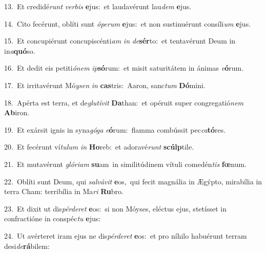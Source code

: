 {\numbfont\textcolor{\numbcolor}{13.}}~Et credidé\textit{runt} \textit{ver}\-\textit{bis} \textbf{e}\-jus:~\star et laudavérunt lau\textit{dem} \textbf{e}\-jus.\par
{\numbfont\textcolor{\numbcolor}{14.}}~Cito fecérunt, oblíti sunt \textit{ó}\-\textit{pe}\textit{rum} \textbf{e}\-jus:~\star et non sustinuérunt consíli\textit{um} \textbf{e}\-jus.\par
{\numbfont\textcolor{\numbcolor}{15.}}~Et concupiérunt concupiscénti\textit{am} \textit{in} \textit{de}\-\textbf{sér}to:~\star et tentavérunt Deum in in\-\textit{a}\-\textbf{quó}so.\par
{\numbfont\textcolor{\numbcolor}{16.}}~Et dedit eis petiti\-\textit{ó}\-\textit{nem} \textit{ip}\-\textbf{só}rum:~\star et misit saturitátem in ánimas \textit{e}\-\textbf{ó}rum.\par
{\numbfont\textcolor{\numbcolor}{17.}}~Et irritavérunt Mó\-\textit{y}\-\textit{sen} \textit{in} \textbf{cas}\-tris:~\star Aaron, sanc\textit{tum} \textbf{Dó}\-mini.\par
{\numbfont\textcolor{\numbcolor}{18.}}~Apérta est terra, et de\-\textit{glu}\-\textit{tí}\textit{vit} \textbf{Da}\-than:~\star et opéruit super congregatió\textit{nem} \textbf{Ab}\-iron.\par
{\numbfont\textcolor{\numbcolor}{19.}}~Et exársit ignis in syna\-\textit{gó}\-\textit{ga} \textit{e}\-\textbf{ó}rum:~\star flamma combússit pec\-\textit{ca}\-\textbf{tó}res.\par
{\numbfont\textcolor{\numbcolor}{20.}}~Et fecérunt ví\-\textit{tu}\-\textit{lum} \textit{in} \textbf{Ho}\-reb:~\star et adoravé\textit{runt} \textbf{scúlp}\-tile.\par
{\numbfont\textcolor{\numbcolor}{21.}}~Et mutavérunt \textit{gló}\-\textit{ri}\textit{am} \textbf{su}\-am~\star in similitúdinem vítuli comedén\textit{tis} \textbf{fœ}\-num.\par
{\numbfont\textcolor{\numbcolor}{22.}}~Oblíti sunt Deum, qui \textit{sal}\-\textit{vá}\textit{vit} \textbf{e}\-os,~\star qui fecit magnália in Ægýpto, mirabília in terra Cham: terribília in Ma\textit{ri} \textbf{Ru}\-bro.\par
{\numbfont\textcolor{\numbcolor}{23.}}~Et dixit ut dis\-\textit{pér}\-\textit{de}\textit{ret} \textbf{e}\-os:~\star si non Móyses, eléctus ejus, stetísset in confractióne in conspéc\textit{tu} \textbf{e}\-jus:\par
{\numbfont\textcolor{\numbcolor}{24.}}~Ut avérteret iram ejus ne dis\-\textit{pér}\-\textit{de}\textit{ret} \textbf{e}\-os:~\star et pro níhilo habuérunt terram desi\-\textit{de}\-\textbf{rá}bilem:\par
